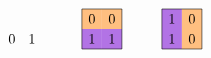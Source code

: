 \documentclass[12pt]{article}
\theoremstyle{definition} %
\begin{document}
\[\begin{tikzpicture}[scale=1]
\begin{scope}[shift={(8,0)}]
        \draw (.25,.25) node{$0$}; \draw (.75,.25) node{$1$};
    \end{scope}
    \begin{scope}[shift={(10,0)}]
        \path[fill=actOrange] (0,.5) rectangle ++(.5,.5); 
        \path[fill=actOrange] (.5,.5) rectangle ++(.5,.5);
        \path[fill=actPurple] (0,0) rectangle ++(.5,.5);
        \path[fill=actPurple] (.5,0) rectangle ++(.5,.5);
        \draw (0,0) rectangle (1,1);
        \draw (.25,.75) node{$0$}; \draw (.75,.75) node{$0$};
        \draw (.25,.25) node{$1$}; \draw (.75,.25) node{$1$};
    \end{scope}
    \begin{scope}[shift={(12,0)}]
        \path[fill=actPurple] (0,.5) rectangle ++(.5,.5); 
        \path[fill=actOrange] (.5,.5) rectangle ++(.5,.5);
        \path[fill=actPurple] (0,0) rectangle ++(.5,.5);
        \path[fill=actOrange] (.5,0) rectangle ++(.5,.5);
        \draw (0,0) rectangle (1,1);
        \draw (.25,.75) node{$1$}; \draw (.75,.75) node{$0$};
        \draw (.25,.25) node{$1$}; \draw (.75,.25) node{$0$};
    \end{scope}
\end{tikzpicture}
\]

\vfill
\end{document}
